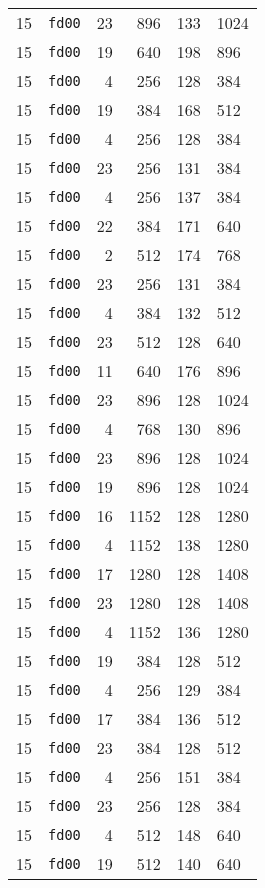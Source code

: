 \documentclass{article}
\begin{document}
\begin{table}[h!]
\begin{tabular}{llrrrl}
    15 & \texttt{fd00} & 23 & 896 & 133 & 1024 \\
    15 & \texttt{fd00} & 19 & 640 & 198 & 896 \\
    15 & \texttt{fd00} & 4 & 256 & 128 & 384 \\
    15 & \texttt{fd00} & 19 & 384 & 168 & 512 \\
    15 & \texttt{fd00} & 4 & 256 & 128 & 384 \\
    15 & \texttt{fd00} & 23 & 256 & 131 & 384 \\
    15 & \texttt{fd00} & 4 & 256 & 137 & 384 \\
    15 & \texttt{fd00} & 22 & 384 & 171 & 640 \\
    15 & \texttt{fd00} & 2 & 512 & 174 & 768 \\
    15 & \texttt{fd00} & 23 & 256 & 131 & 384 \\
    15 & \texttt{fd00} & 4 & 384 & 132 & 512 \\
    15 & \texttt{fd00} & 23 & 512 & 128 & 640 \\
    15 & \texttt{fd00} & 11 & 640 & 176 & 896 \\
    15 & \texttt{fd00} & 23 & 896 & 128 & 1024 \\
    15 & \texttt{fd00} & 4 & 768 & 130 & 896 \\
    15 & \texttt{fd00} & 23 & 896 & 128 & 1024 \\
    15 & \texttt{fd00} & 19 & 896 & 128 & 1024 \\
    15 & \texttt{fd00} & 16 & 1152 & 128 & 1280 \\
    15 & \texttt{fd00} & 4 & 1152 & 138 & 1280 \\
    15 & \texttt{fd00} & 17 & 1280 & 128 & 1408 \\
    15 & \texttt{fd00} & 23 & 1280 & 128 & 1408 \\
    15 & \texttt{fd00} & 4 & 1152 & 136 & 1280 \\
    15 & \texttt{fd00} & 19 & 384 & 128 & 512 \\
    15 & \texttt{fd00} & 4 & 256 & 129 & 384 \\
    15 & \texttt{fd00} & 17 & 384 & 136 & 512 \\
    15 & \texttt{fd00} & 23 & 384 & 128 & 512 \\
    15 & \texttt{fd00} & 4 & 256 & 151 & 384 \\
    15 & \texttt{fd00} & 23 & 256 & 128 & 384 \\
    15 & \texttt{fd00} & 4 & 512 & 148 & 640 \\
    15 & \texttt{fd00} & 19 & 512 & 140 & 640 \\

\end{tabular}
\end{table}
\end{document}
